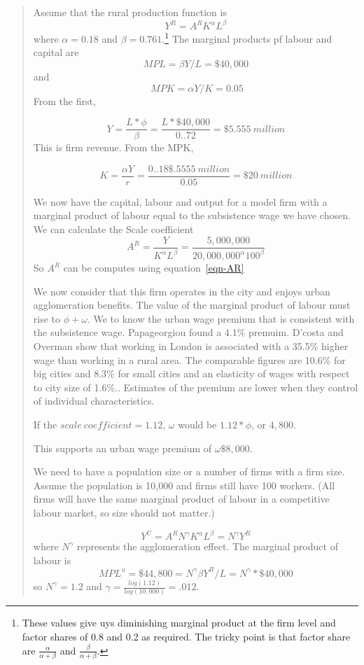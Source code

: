 \begin{enumerate}
\begin{quotation}
Assume that the rural production function is 
\[Y^R=A^R K^\alpha L^\beta\]
where $\alpha=0.18$  and $\beta=0.761$.\footnote{These values give uys diminishing marginal product at the firm level and factor shares of 0.8 and 0.2 as required. The tricky point is that factor share are $\frac{\alpha}{\alpha + \beta}$ and $\frac{\beta}{\alpha + \beta}$. }  The marginal products pf labour and capital are 
\[MPL=\beta Y/L=\$40,000\] and\[\ MPK=\alpha Y/K =0.05\]
From the first, 

\[Y=\frac{L*\phi}{\beta}=\frac{L*\$40,000}{0..72}=\$5.555\ million\]
This is firm revenue. From the MPK, 

\[K=  \frac{\alpha Y }{r}=\frac{0..18 \$.5555\ million}{0.05} =\$20\ million \]

We now have the capital, labour and output for a model firm with a marginal product of labour  equal to the subsistence wage we have chosen. We can calculate the Scale coefficient 
\begin{equation}  
A^R= \frac{Y}{K^\alpha L^\beta}=\frac{5,000,000}{20,000,000^\alpha 100^\beta}\label{eqn-AR}\end{equation} 
So $A^R$ can be computes using equation~\ref{eqn-AR}


We now consider that this firm operates in the city and enjoys  urban agglomeration benefits. The value of the  marginal product of labour must rise to $\phi+\omega$. We to know  the urban wage premium that is consistent with the subsistence wage. Papageorgiou \cite{papageorgiouOccupationalMatchingCities2022} found a 4.1\% premuim. D'costa and Overman   show that working in London is associated with a 35.5\% higher wage than working in a rural area. The comparable figures are
10.6\% for big cities and 8.3\% for small cities and an elasticity of
wages with respect to city size of 1.6\%.. Estimates of the premium are lower  when they control of individual characteristics.   



If the $ scale\ coefficient=1.12$, $\omega$ would be $1.12*\phi$, or $4,800$. 


This supports an urban wage premium of $\omega\$8,000$.

We need to have a population size or a number of firms with a firm size. Assume the population is 10,000 and firms still have 100 workers. (All firms will have the same marginal product of labour in a competitive labour market, so size should not matter.)

\[Y^U=A^R N^\gamma K^\alpha L^\beta = N^\gamma Y^R\]
where $N^\gamma$ represents the agglomeration effect. The marginal product of labour is 
\[MPL^u=\$44,800=N^\gamma \beta Y^R/L=N^\gamma *\$40,000\]
so $N^\gamma= 1.2$ and $\gamma = \frac{log(1.12)}{log(10,000)} =.012$. 



\end{quotation}
\end{enumerate}
